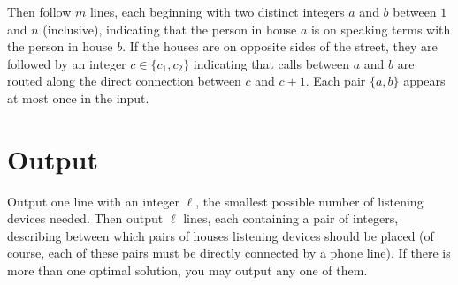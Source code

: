 Then follow $m$ lines, each beginning with two distinct integers $a$
and $b$ between $1$ and $n$ (inclusive), indicating that the person in
house $a$ is on speaking terms with the person in house $b$.  If the
houses are on opposite sides of the street, they are followed by an
integer $c \in \{c_1, c_2\}$ indicating that calls between $a$ and $b$
are routed along the direct connection between $c$ and $c+1$.  Each
pair $\{a,b\}$ appears at most once in the input.

\section*{Output}

Output one line with an integer $\ell$, the smallest possible number
of listening devices needed.  Then output $\ell$ lines, each
containing a pair of integers, describing between which pairs of
houses listening devices should be placed (of course, each of these
pairs must be directly connected by a phone line).  If there is more
than one optimal solution, you may output any one of them.
